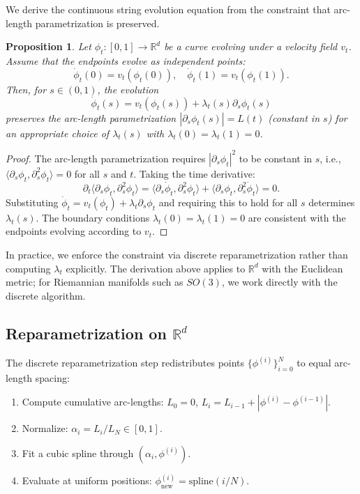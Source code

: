 \documentclass{article}
\theoremstyle{plain}
\newtheorem{proposition}[theorem]{Proposition}
\theoremstyle{definition}
\theoremstyle{remark}
\begin{document}
We derive the continuous string evolution equation from the constraint that arc-length parametrization is preserved.

\begin{proposition}
Let $\phi_t: [0,1] \to \mathbb{R}^d$ be a curve evolving under a velocity field $v_t$. Assume that the endpoints evolve as independent points:
\begin{equation}
    \dot{\phi}_t(0) = v_t(\phi_t(0)), \quad \dot{\phi}_t(1) = v_t(\phi_t(1)).
\end{equation}
Then, for $s \in (0,1)$, the evolution
\begin{equation}
    \dot{\phi}_t(s) = v_t(\phi_t(s)) + \lambda_t(s) \partial_s \phi_t(s)
\end{equation}
preserves the arc-length parametrization $|\partial_s \phi_t(s)| = L(t)$ (constant in $s$) for an appropriate choice of $\lambda_t(s)$ with $\lambda_t(0) = \lambda_t(1) = 0$.
\end{proposition}

\begin{proof}
The arc-length parametrization requires $|\partial_s \phi_t|^2$ to be constant in $s$, i.e., $\langle \partial_s \phi_t, \partial_s^2 \phi_t \rangle = 0$ for all $s$ and $t$. Taking the time derivative:
\begin{equation}
    \partial_t \langle \partial_s \phi_t, \partial_s^2 \phi_t \rangle = \langle \partial_s \dot{\phi}_t, \partial_s^2 \phi_t \rangle + \langle \partial_s \phi_t, \partial_s^2 \dot{\phi}_t \rangle = 0.
\end{equation}
Substituting $\dot{\phi}_t = v_t(\phi_t) + \lambda_t \partial_s \phi_t$ and requiring this to hold for all $s$ determines $\lambda_t(s)$. The boundary conditions $\lambda_t(0) = \lambda_t(1) = 0$ are consistent with the endpoints evolving according to $v_t$.
\end{proof}

In practice, we enforce the constraint via discrete reparametrization rather than computing $\lambda_t$ explicitly. The derivation above applies to $\mathbb{R}^d$ with the Euclidean metric; for Riemannian manifolds such as $SO(3)$, we work directly with the discrete algorithm.

\subsection{Reparametrization on $\mathbb{R}^d$} \label{sec:reparam}

The discrete reparametrization step redistributes points $\{\phi^{(i)}\}_{i=0}^N$ to equal arc-length spacing:
\begin{enumerate}
    \item Compute cumulative arc-lengths: $L_0 = 0$, $L_i = L_{i-1} + |\phi^{(i)} - \phi^{(i-1)}|$.
    \item Normalize: $\alpha_i = L_i / L_N \in [0,1]$.
    \item Fit a cubic spline through $(\alpha_i, \phi^{(i)})$.
    \item Evaluate at uniform positions: $\phi^{(i)}_{\text{new}} = \text{spline}(i/N)$.
\end{enumerate}
\end{document}
